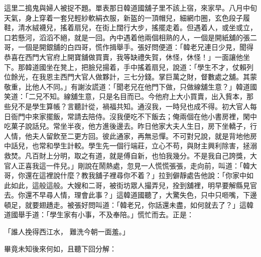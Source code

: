這里二搗鬼與婦人被捉不題。單表那日韓道國舖子里不該上宿，來家早。八月中旬天氣，身上穿着一套兒輕紗軟絹衣服，新盔的一頂帽兒，細網巾圈，玄色段子履鞋，清水絨襪兒，搖着扇兒，在街上闊行大步，搖擺走着。但遇着人，或坐或立，口若懸河，滔滔不絕，就是一回。內中遇着他兩個相熟的人，一個是開紙舖的張二哥，一個是開銀舖的白四哥，慌作揖舉手。張好問便道：「韓老兄連日少見，聞得恭喜在西門大官府上開寶舖做買賣，我等缺禮失賀，休怪，休怪！」一面讓他坐下。那韓道國坐在凳上，把臉兒揚着，手中搖着扇兒，說道：「學生不才，仗賴列位餘光，在我恩主西門大官人做夥計，三七分錢。掌巨萬之財，督數處之舖。其蒙敬重，比他人不同。」有謝汝謊道：「聞老兄在他門下做，只做線舖生意？」韓道國笑道：「二兄不知。線舖生意，只是名目而已。今他府上大小買賣，出入貲本，那些兒不是學生算帳？言聽計從，禍福共知。通沒我，一時兒也成不得。初大官人每日衙門中來家擺飯，常請去陪侍。沒我便吃不下飯去；俺兩個在他小書房裡，閑中吃菓子說話兒。常坐半夜，他方進後邊去。昨日他家大夫人生日，房下坐轎子，行人情，他夫人留飲至二更方回。彼此通家，再無忌憚。不可對兄說，就是背地他房中話兒，也常和學生計較。學生先一個行端莊，立心不苟，與財主興利除害，拯溺救焚。凡百財上分明，取之有道，就是傅自新，也怕我幾分。不是我自己誇獎，大官人正喜我這一件兒。」剛說在鬧熱處，忽見一人慌慌張張，走向前，叫道：「韓大哥，你還在這裡說什麼？教我舖子裡尋你不着？」拉到僻靜處告他說：「你家中如此如此，這般這般。大嫂和二哥，被街坊眾人撮弄兒，拴到舖裡，明早要解縣見官去。你還不早尋人情，理會此事？」這韓道國聽了，大驚失色，只中只咂嘴，下邊頓足，就要翅趫走。被張好問叫道：「韓老兄，你話還未盡，如何就去了？」這韓道國舉手道：「學生家有小事，不及奉陪。」慌忙而去。正是：

「誰人挽得西江水，  難洗今朝一面羞。」

畢竟未知後來何如，且聽下回分解：


